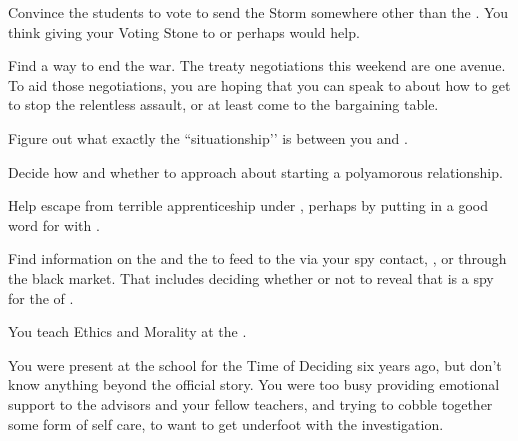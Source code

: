 \documentclass[char]{GL2020}
\begin{document}
\begin{itemz}
    \item Convince the students to vote to send the Storm somewhere other than the \pShip{}.  You think giving your Voting Stone to \cWarlordDaughter{} or perhaps \cScholarship{} would help.
    \item Find a way to end the war. The treaty negotiations this weekend are one avenue. To aid those negotiations, you are hoping that you can speak to \cWarlordDaughter{} about how to get \cLoud{} to stop the relentless \pShip{} assault, or at least come to the bargaining table.
    \item Figure out what exactly the ``situationship’’ is between you and \cJuniorStatesman{}.
    \item Decide how and whether to approach \cBeetle{} about starting a polyamorous relationship.
    \item Help \cScholarship{} escape from \cScholarship{\their} terrible apprenticeship under \cAntiChup{}, perhaps by putting in a good word for \cScholarship{\them} with \cBeetle{}.
    \item Find information on the \pFarm{} and the \pTech{} to feed to the \pShip{} via your spy contact, \cBunker{}, or through the black market. That includes deciding whether or not to reveal that \cHistory{} is a spy for the \cQueen{\Monarch} of \pFarm{}.
\end{itemz}

\begin{itemz}[Notes]
    \item You teach Ethics and Morality at the \pSchool{}.
    \item You were present at the school for the Time of Deciding six years ago, but don't know anything beyond the official story. You were too busy providing emotional support to the advisors and your fellow teachers, and trying to cobble together some form of self care, to want to get underfoot with the investigation.
\end{itemz}
\end{document}
